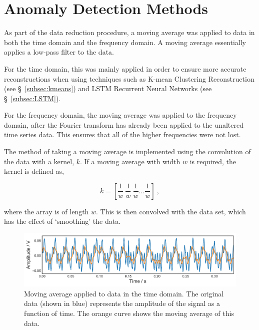 \section{Anomaly Detection Methods}
\label{sec:methods}

As part of the data reduction procedure, a moving average was applied to data in both the time domain and the frequency domain. A moving average essentially applies a low-pass filter to the data.

For the time domain, this was mainly applied in order to ensure more accurate reconstructions when using techniques such as K-mean Clustering Reconstruction (see \S~\ref{subsec:kmeans}) and LSTM Recurrent Neural Networks (see \S~\ref{subsec:LSTM}).

For the frequency domain, the moving average was applied to the frequency domain, after the Fourier transform has already been applied to the unaltered time series data. This ensures that all of the higher frequencies were not lost.

The method of taking a moving average is implemented using the convolution of the data with a kernel, $k$. If a moving average with width $w$ is required, the kernel is defined as,

\begin{equation}
    k = \left[ \dfrac{1}{w}~\dfrac{1}{w}~\dfrac{1}{w}...\dfrac{1}{w}  \right]~,
    \label{eq:conv_kernel}
\end{equation}

where the array is of length $w$. This is then convolved with the data set, which has the effect of `smoothing' the data.

\begin{figure}[t]
    \includegraphics[width=1.0\textwidth]{fig/moving_average.pdf}
    \caption[Time Domain]{Moving average applied to data in the time domain. The original data (shown in blue) represents the amplitude of the signal as a function of time. The orange curve shows the moving average of this data.}
    \label{fig:moving_av}
\end{figure}

